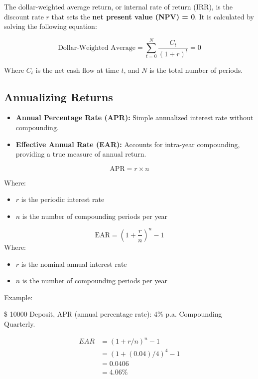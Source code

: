 \documentclass[
]{book}
\providecommand{\tightlist}{%
  \setlength{\itemsep}{0pt}\setlength{\parskip}{0pt}}
\begin{document}
The dollar-weighted average return, or internal rate of return (IRR), is the discount rate \(r\) that sets the \textbf{net present value (NPV) = 0}. It is calculated by solving the following equation:

\[ \text{Dollar-Weighted Average} = \sum_{t=0}^{N} \frac{C_t}{(1 + r)^t} = 0 \]

Where \(C_t\) is the net cash flow at time \(t\), and \(N\) is the total number of periods.

\hypertarget{annualizing-returns}{%
\subsection{Annualizing Returns}\label{annualizing-returns}}

\begin{itemize}
\tightlist
\item
  \textbf{Annual Percentage Rate (APR):} Simple annualized interest rate without compounding.
\item
  \textbf{Effective Annual Rate (EAR):} Accounts for intra-year compounding, providing a true measure of annual return.
\end{itemize}

\[
\text{APR} = r \times n
\]

Where:

\begin{itemize}
\tightlist
\item
  \(r\) is the periodic interest rate
\item
  \(n\) is the number of compounding periods per year
\end{itemize}

\[
\text{EAR} = \left(1 + \frac{r}{n}\right)^n - 1
\]
Where:

\begin{itemize}
\tightlist
\item
  \(r\) is the nominal annual interest rate
\item
  \(n\) is the number of compounding periods per year
\end{itemize}

Example:

\$ 10000 Deposit, APR (annual percentage rate): 4\% p.a. Compounding Quarterly.

\[ 
\begin{aligned}
EAR &= (1+r/n)^n− 1 \\
&=(1+(0.04)/4)^4 −1 \\
&=0.0406 \\
&= 4.06\% 
\end{aligned}
\]
\end{document}
